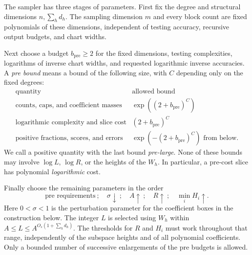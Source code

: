 The sampler has three stages of parameters.
First fix the degree and structural dimensions $n,\sum_hd_h$.
The sampling dimension $m$ and every block count are fixed polynomials
of these dimensions, independent of testing accuracy, recursive output
budgets, and chart widths.

Next choose a budget $b_{\mathrm{pre}}\ge2$ for the fixed dimensions,
testing complexities, logarithms of inverse chart widths, and requested
logarithmic inverse accuracies.  A \emph{pre bound} means a bound of the
following size, with $C$ depending only on the fixed degrees:
\[
\begin{array}{c|c}
\text{quantity} & \text{allowed bound}\\ \hline
\text{counts, caps, and coefficient masses}
  & \exp((2+b_{\mathrm{pre}})^C)\\
\text{logarithmic complexity and slice cost}
  & (2+b_{\mathrm{pre}})^C\\
\text{positive fractions, scores, and errors}
  & \exp(-(2+b_{\mathrm{pre}})^C)\text{ from below}.
\end{array}
\]
We call a positive quantity with the last bound \emph{pre-large}.
None of these bounds may involve $\log L$, $\log R$, or the heights
of the $W_h$.  In particular, a pre-cost slice has polynomial
\emph{logarithmic} cost.

Finally choose the remaining parameters in the order
\begin{equation}\label{sampling:choice-order}
 \text{pre requirements}\ ;\quad
 \sigma\downarrow\ ;\quad A\uparrow\ ;\quad R\uparrow\ ;\quad
 \min_iH_i\uparrow.
\end{equation}
Here $0<\sigma<1$ is the perturbation parameter for the coefficient boxes
in the construction below.
The integer $L$ is selected using $W_h$ within
$A\le L\le A^{O_s(1+\sum_hd_h)}$.
The thresholds for $R$ and $H_i$ must work throughout that range, independently
of the subspace heights and of all polynomial coefficients.  Only a bounded
number of successive enlargements of the pre budgets is allowed.


